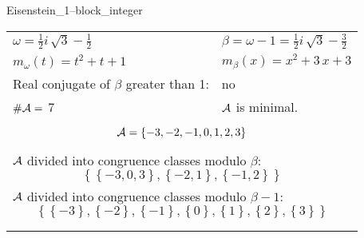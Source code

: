 \begin{exmp}
\label{ex:compareAB}

Eisenstein\_1--block\_integer

\rule{0cm}{0cm}

\begin{tabular}{ll}
$\omega=  \frac{1}{2} i \, \sqrt{3} - \frac{1}{2} $  & $\beta= \omega - 1 = \frac{1}{2} i \, \sqrt{3} - \frac{3}{2} $\\
$m_\omega(t)=  t^{2} + t + 1 $  & $m_\beta(x)=  x^{2} + 3 \, x + 3 $\\
Real conjugate of $\beta$ greater than 1:   &  no \\
$\#\mathcal{A}= $ 7 $ $ & $\mathcal{A}$ is minimal. \\
\multicolumn{2}{l}{\begin{minipage}{\textwidth}\begin{dmath*}\A = \left\{-3, -2, -1, 0, 1, 2, 3\right\}  \end{dmath*}\end{minipage} }\\
\multicolumn{2}{l}{\begin{minipage}{\textwidth}$\mathcal{A}$ divided into congruence classes modulo $\beta$: \begin{dmath*} \left\{\left\{-3, 0, 3\right\}, \left\{-2, 1\right\}, \left\{-1, 2\right\}\right\}  \end{dmath*}\end{minipage} }\\[10pt]
\multicolumn{2}{l}{\begin{minipage}{\textwidth}$\mathcal{A}$ divided into congruence classes modulo $\beta-1$: \begin{dmath*} \left\{\left\{-3\right\}, \left\{-2\right\}, \left\{-1\right\}, \left\{0\right\}, \left\{1\right\}, \left\{2\right\}, \left\{3\right\}\right\}  \end{dmath*}\end{minipage} }\\
 & \\ \hline
 & \\
\end{tabular}


\end{exmp}
